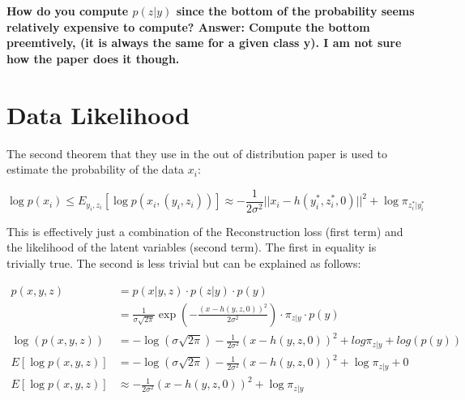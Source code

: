 \documentclass{report}
\begin{document}
	\textbf{How do you compute $p(z|y)$ since the bottom of the probability seems relatively expensive to compute? Answer: Compute the bottom preemtively, (it is always the same for a given class y). I am not sure how the paper does it though.}
	
	\section{Data Likelihood}
	The second theorem that they use in the out of distribution paper is used to estimate the probability of the data $x_i$:
	
	\begin{equation}
	\log p (x_i) \leq E_{y_i, z_i}\left[\log p\left(x_i, (y_i, z_i)\right)\right] \approx -\frac{1}{2\sigma^2}||x_i - h(y_i^*, z_i^*, 0)||^2 + \log \pi_{z_i^*|y_i^*}
	\end{equation}
	
	This is effectively just a combination of the Reconstruction loss (first term) and the likelihood of the latent variables (second term). The first in equality is trivially true. The second is less trivial but can be explained as follows:
	
	\begin{equation}
	\begin{split}
		p(x, y, z) &= p(x | y, z) \cdot p(z | y) \cdot p(y) \\
		&= \frac{1}{\sigma \sqrt{2\pi}} \exp(-\frac{(x - h(y, z, 0))^2}{2\sigma^2}) \cdot \pi_{z|y} \cdot p(y) \\
		\log(p(x, y, z)) &= -\log(\sigma \sqrt{2\pi}) - \frac{1}{2\sigma^2}(x - h(y, z, 0))^2 + log \pi_{z|y} + log(p(y))\\
		E[\log p(x, y, z)] &= -\log(\sigma \sqrt{2\pi}) -\frac{1}{2\sigma^2}(x - h(y, z, 0))^2 + \log \pi_{z|y} + 0 \\
		E[\log p(x, y, z)] & \approx -\frac{1}{2\sigma^2}(x - h(y, z, 0))^2 + \log \pi_{z|y}
	\end{split}
	\end{equation}
	

	
\end{document}
